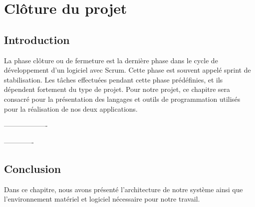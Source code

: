 \chapter{ Cl\^{o}ture du projet }

\section{Introduction}

La phase cl\^{o}ture ou de fermeture est la derni\`{e}re phase dans le cycle de d\'{e}veloppement d'un
logiciel avec Scrum. Cette phase est souvent appel\'{e} sprint de stabilisation. Les t\^{a}ches
effectu\'{e}es pendant cette phase pr\'{e}d\'{e}finies, et ils d\'{e}pendent fortement du type de projet.
Pour notre projet, ce chapitre sera consacr\'{e} pour la pr\'{e}sentation des langages et outils de
programmation utilis\'{e}s pour la r\'{e}alisation de nos deux applications.

-------------------

-------------

\section{Conclusion}

Dans ce chapitre, nous avons présenté l’architecture de notre système ainsi que
l’environnement matériel et logiciel nécessaire pour notre travail.


















